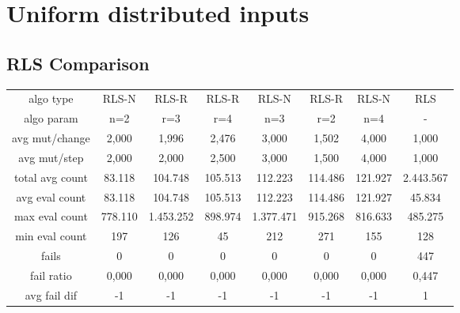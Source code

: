 \section{Uniform distributed inputs}

\subsection{RLS Comparison}

\begin{tabular}[h]{cccccccc}
algo type&            RLS-N&     RLS-R&     RLS-R&     RLS-N&     RLS-R&     RLS-N&       RLS\\
algo param&             n=2&       r=3&       r=4&       n=3&       r=2&       n=4&         -\\
avg mut/change&       2,000&     1,996&     2,476&     3,000&     1,502&     4,000&     1,000\\
avg mut/step&         2,000&     2,000&     2,500&     3,000&     1,500&     4,000&     1,000\\
\hline
total avg count&     83.118&   104.748&   105.513&   112.223&   114.486&   121.927& 2.443.567\\
avg eval count&      83.118&   104.748&   105.513&   112.223&   114.486&   121.927&    45.834\\
max eval count&     778.110& 1.453.252&   898.974& 1.377.471&   915.268&   816.633&   485.275\\
min eval count&         197&       126&        45&       212&       271&       155&       128\\
\hline
fails&                    0&         0&         0&         0&         0&         0&       447\\
fail ratio&           0,000&     0,000&     0,000&     0,000&     0,000&     0,000&     0,447\\
avg fail dif&            -1&        -1&        -1&        -1&        -1&        -1&         1\\
\end{tabular}

